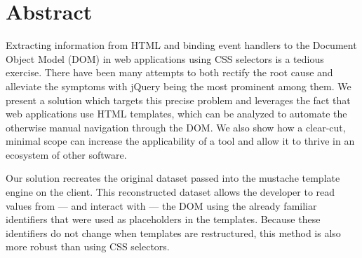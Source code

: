 \documentclass[thesis.tex]{subfiles}
\begin{document}
\chapter*{Abstract}
\label{chap:abstract}

Extracting information from HTML and binding event handlers to the
Document Object Model (DOM) in web applications using CSS selectors is a tedious
exercise. There have been many attempts to both rectify the root cause and
alleviate the symptoms with jQuery being the most prominent among them.
We present a solution which targets this precise problem and leverages the fact
that web applications use HTML templates, which can be analyzed to automate
the otherwise manual navigation through the DOM.
We also show how a clear-cut, minimal scope can increase the applicability of
a tool and allow it to thrive in an ecosystem of other software.

Our solution recreates the original dataset passed into the mustache template
engine on the client. This reconstructed dataset allows the developer
to read values from --- and interact with --- the DOM using the already familiar
identifiers that were used as placeholders in the templates.
Because these identifiers do not change when templates are restructured, this
method is also more robust than using CSS selectors.
\end{document}
